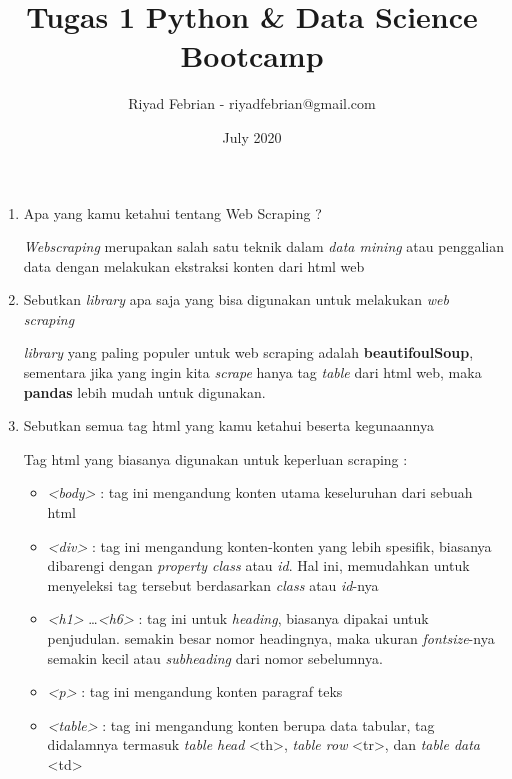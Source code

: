 \documentclass{report}
\title{Tugas 1 Python \& Data Science Bootcamp}
\author{Riyad Febrian - riyadfebrian@gmail.com}
\date{July 2020}
\begin{document}
\maketitle


\begin{enumerate}
    \item Apa yang kamu ketahui tentang Web Scraping ?
    
        \emph{Webscraping} merupakan salah satu teknik dalam \emph{data mining} atau penggalian data dengan melakukan ekstraksi konten dari html web
    
    \item Sebutkan \emph{library} apa saja yang bisa digunakan untuk melakukan \emph{web scraping}
    
        \emph{library} yang paling populer untuk web scraping adalah \textbf{beautifoulSoup}, sementara jika yang ingin kita \emph{scrape} hanya tag \emph{table} dari html web, maka \textbf{pandas} lebih mudah untuk digunakan.
    
    \item Sebutkan semua tag html yang kamu ketahui beserta kegunaannya
    
        Tag html yang biasanya digunakan untuk keperluan scraping :
        \begin{itemize}
            \item \emph{\textless body\textgreater} :
            tag ini mengandung konten utama keseluruhan dari sebuah html
            
            \item \emph{\textless div\textgreater} :
            tag ini mengandung konten-konten yang lebih spesifik, biasanya dibarengi dengan \emph{property class} atau \emph{id}. Hal ini, memudahkan untuk menyeleksi tag tersebut berdasarkan \emph{class} atau \emph{id}-nya
            
            \item \emph{\textless h1\textgreater} \ldots \emph{\textless h6\textgreater} :
            tag ini untuk \emph{heading}, biasanya dipakai untuk penjudulan. semakin besar nomor headingnya, maka ukuran \emph{fontsize}-nya semakin kecil atau \emph{subheading} dari nomor sebelumnya.
            
            \item \emph{\textless p\textgreater} :
            tag ini mengandung konten paragraf teks
            
            \item \emph{\textless table\textgreater}  :
            tag ini mengandung konten berupa data tabular, tag didalamnya termasuk \emph{table head} \textless th\textgreater, \emph{table row} \textless tr\textgreater, dan \emph{table data} \textless td\textgreater
            

\end{itemize}
\end{enumerate}
\end{document}
